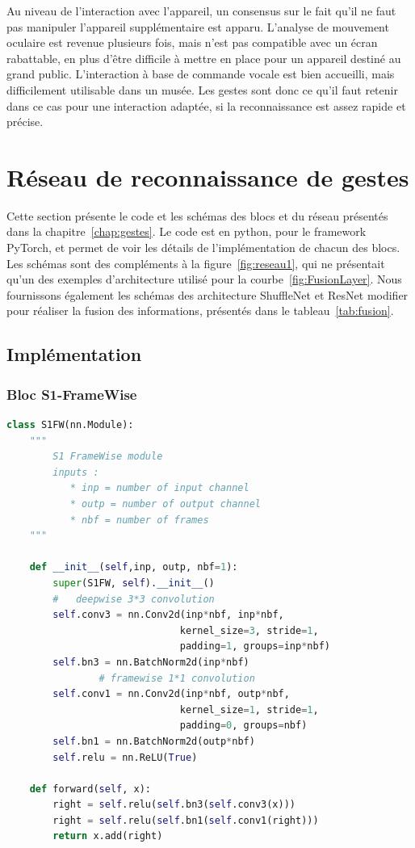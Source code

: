 Au niveau de l’interaction avec l’appareil, un consensus sur le fait qu’il ne faut pas manipuler l'appareil supplémentaire est apparu.
L’analyse de mouvement oculaire est revenue plusieurs fois, mais n’est pas compatible avec un écran rabattable, en plus d’être difficile à mettre en place pour un appareil destiné au grand public. 
L’interaction à base de commande vocale est bien accueilli, mais difficilement utilisable dans un musée.
Les gestes sont donc ce qu’il faut retenir dans ce cas pour une interaction adaptée, si la reconnaissance est assez rapide et précise. 


%
%
%
%
\chapter{Réseau de reconnaissance de gestes}


Cette section présente le code et les schémas des blocs et du réseau présentés dans la chapitre~\ref{chap:gestes}. 
Le code est en python, pour le framework PyTorch, et permet de voir les détails de l'implémentation de chacun des blocs.
Les schémas sont des compléments à la figure~\ref{fig:reseau1}, qui ne présentait qu'un des exemples d'architecture utilisé pour la courbe~\ref{fig:FusionLayer}.
Nous fournissons également les schémas des architecture ShuffleNet et ResNet modifier pour réaliser la fusion des informations, présentés dans le tableau~\ref{tab:fusion}.


\section{Implémentation}
\label{sec:implementation}

\subsection{Bloc S1-FrameWise}
\label{sec:implementationS1}

\begin{lstlisting}[language=Python]
class S1FW(nn.Module):
    """
        S1 FrameWise module
        inputs : 
           * inp = number of input channel
           * outp = number of output channel
           * nbf = number of frames
    """
    
    def __init__(self,inp, outp, nbf=1):
        super(S1FW, self).__init__()
        #	deepwise 3*3 convolution 
        self.conv3 = nn.Conv2d(inp*nbf, inp*nbf, 
                              kernel_size=3, stride=1,
                              padding=1, groups=inp*nbf)
        self.bn3 = nn.BatchNorm2d(inp*nbf)
				# framewise 1*1 convolution
        self.conv1 = nn.Conv2d(inp*nbf, outp*nbf, 
                              kernel_size=1, stride=1, 
                              padding=0, groups=nbf)
        self.bn1 = nn.BatchNorm2d(outp*nbf)
        self.relu = nn.ReLU(True)
        
    def forward(self, x):
        right = self.relu(self.bn3(self.conv3(x)))
        right = self.relu(self.bn1(self.conv1(right)))
        return x.add(right)
\end{lstlisting}


